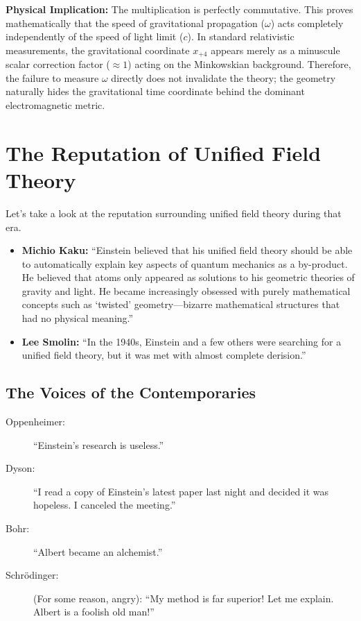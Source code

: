\documentclass[11pt,a4paper,oneside]{article}
\begin{document}
\textbf{Physical Implication:} The multiplication is perfectly commutative. This proves mathematically that the speed of gravitational propagation ($\omega$) acts completely independently of the speed of light limit ($c$). In standard relativistic measurements, the gravitational coordinate $x_{+4}$ appears merely as a minuscule scalar correction factor ($\approx 1$) acting on the Minkowskian background. Therefore, the failure to measure $\omega$ directly does not invalidate the theory; the geometry naturally hides the gravitational time coordinate behind the dominant electromagnetic metric.

\section{The Reputation of Unified Field Theory}

Let's take a look at the reputation surrounding unified field theory during that era.

\begin{itemize}
    \item \textbf{Michio Kaku:} ``Einstein believed that his unified field theory should be able to automatically explain key aspects of quantum mechanics as a by-product. He believed that atoms only appeared as solutions to his geometric theories of gravity and light. He became increasingly obsessed with purely mathematical concepts such as `twisted' geometry—bizarre mathematical structures that had no physical meaning.''
    \item \textbf{Lee Smolin:} ``In the 1940s, Einstein and a few others were searching for a unified field theory, but it was met with almost complete derision.''
\end{itemize}

\subsection{The Voices of the Contemporaries}
\begin{description}
    \item[Oppenheimer:] ``Einstein's research is useless.''
    \item[Dyson:] ``I read a copy of Einstein's latest paper last night and decided it was hopeless. I canceled the meeting.''
    \item[Bohr:] ``Albert became an alchemist.''
    \item[Schrödinger:] (For some reason, angry): ``My method is far superior! Let me explain. Albert is a foolish old man!''
\end{description}
\end{document}
